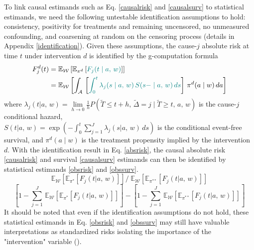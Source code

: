 \documentclass{report}
\newcommand{\1}{\ensuremath{\mathbf{1}}}
\newcommand{\T}{\ensuremath{\widetilde{T}}}
\newcommand{\ax}{\ensuremath{\mid a,\,{w}}}
\newcommand{\x}{\ensuremath{{w}}}
\newcommand{\g}{\ensuremath{\pi}}
\renewcommand{\L}{\ensuremath{W}}
\renewcommand{\l}{\ensuremath{w}}
\newcommand{\tDelta}{\ensuremath{\widetilde{\Delta}}}
\begin{document}
To link causal estimands such as Eq. \eqref{causalrisk} and \eqref{causalsurv} to statistical estimands, we need the following untestable identification assumptions to hold: consistency, positivity for treatments and remaining uncensored, no unmeasured confounding, and coarsening at random on the censoring process (details in Appendix \ref{identification}). Given these assumptions, the cause-\(j\) absolute risk at time \(t\) under intervention \(d\) is identified by the g-computation formula
\begin{align}
F^d_j(t) &= \mathbb{E}_{\mathcal{\L}} \left[ \mathbb{E}_{\g^d} \left[{\color{blue!50!green} F_j(t \ax)} \right] \right] \nonumber \\
&= \mathbb{E}_{\mathcal{\L}} \left[ \int_{\mathcal{A}} \,  \left[{\color{blue!50!green} \int_0^t \lambda_j(s \ax) \, S(s- \ax) \, ds }\right] \, \g^d (a \mid \l) \, da \right] \label{absrisk}
\end{align}
where
\(\lambda_j(t \ax) = \lim\limits_{h \to 0} \frac{1}{h} P(\T \leq t + h,\, \tDelta = j \mid \T \geq t,\, a,\, \x)\) is the cause-\(j\) conditional hazard,\\
\(S(t \ax) = \exp\left(-\int^{t}_{0} \sum\limits_{j=1}^{J} \lambda_j(s \ax) \, ds \right)\) is the conditional event-free survival, and \(\g^d(a \mid \l)\) is the treatment propensity implied by the intervention \(d\). With the identification result in Eq. \eqref{absrisk}, the causal absolute risk \eqref{causalrisk} and survival \eqref{causalsurv} estimands can then be identified by statistical estimands \eqref{obsrisk} and \eqref{obssurv}.
\begin{equation}
\mathbb{E}_{\mathcal{\L}} \left[ \mathbb{E}_{\g^*} \left[ F_j(t \ax) \right] \right] / \; \mathbb{E}_{\mathcal{\L}} \left[ \mathbb{E}_{\g^{**}} \left[ F_j(t \ax) \right] \right] \label{obsrisk}
\end{equation}
\begin{equation}
\left[1 - \sum_{j = 1}^{J} \, \mathbb{E}_{\mathcal{\L}} \left[ \mathbb{E}_{\g^*} \left[ F_j(t \ax) \right] \right] \right] - \left[1 - \sum_{j = 1}^{J} \, \mathbb{E}_{\mathcal{\L}} \left[ \mathbb{E}_{\g^{**}} \left[ F_j(t \ax) \right] \right] \right] \label{obssurv}
\end{equation}
It should be noted that even if the identification assumptions do not hold, these statistical estimands in Eq. \eqref{obsrisk} and \eqref{obssurv} may still have valuable interpretations as standardized risks isolating the importance of the "intervention" variable (\cite{laan_statistical_2006}).
\end{document}
